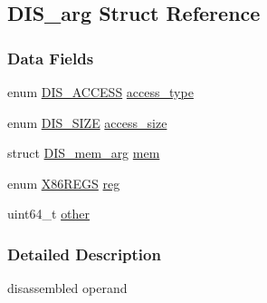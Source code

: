 \hypertarget{struct_d_i_s__arg}{
\subsection{DIS\_\-arg Struct Reference}
\label{struct_d_i_s__arg}
}
\subsubsection*{Data Fields}
\begin{DoxyCompactItemize}
\item 
enum \hyperlink{bytecode__disasm_8h_a3dcc05be268362b3f772b1675e0a882c}{DIS\_\-ACCESS} \hyperlink{struct_d_i_s__arg_a5a7d33b48f73c1d560377f10471d8b00}{access\_\-type}
\item 
enum \hyperlink{bytecode__disasm_8h_a6a0d419b6b61630b1f76a25ff39df84d}{DIS\_\-SIZE} \hyperlink{struct_d_i_s__arg_abe85ed51a3596cdb3a868a284c3d961f}{access\_\-size}
\item 
struct \hyperlink{struct_d_i_s__mem__arg}{DIS\_\-mem\_\-arg} \hyperlink{struct_d_i_s__arg_a883edefb091b4875ffd7bb1f1e61dea3}{mem}
\item 
enum \hyperlink{bytecode__disasm_8h_a87af2e927a80478796188d9d8d813d82}{X86REGS} \hyperlink{struct_d_i_s__arg_a426daf7e6de8cea3128731107457d2cf}{reg}
\item 
uint64\_\-t \hyperlink{struct_d_i_s__arg_aabf8b24bd58cc13ea953e9add24d4387}{other}
\end{DoxyCompactItemize}


\subsubsection{Detailed Description}
disassembled operand 

